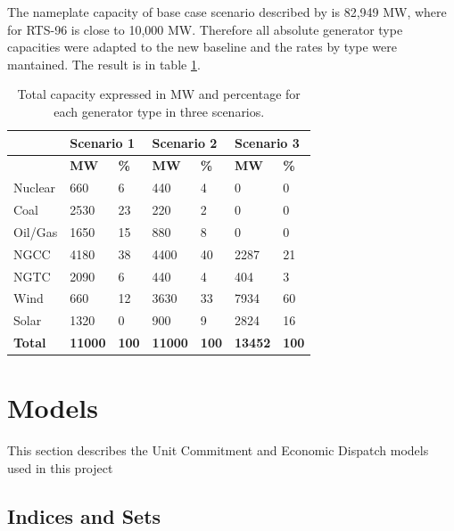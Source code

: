 \documentclass[12pt,LUDisStyle,twosided]{book}
\begin{document}
The nameplate capacity of base case scenario described by \citeauthor{shavel} is 82,949 MW, where for RTS-96 is close to 10,000 MW. Therefore all absolute generator type capacities were adapted to the new baseline and the rates by type were mantained. The result is in table \ref{table:ScenarioDataDescription}.

\begin{table}[h]
\centering
\begin{tabular}{|lllllll|}
\hline
 & \multicolumn{2}{l}{\textbf{Scenario 1}} & \multicolumn{2}{l}{\textbf{Scenario 2}} & \multicolumn{2}{l|}{\textbf{Scenario 3}} \\ \hline
 & \textbf{MW} & \textbf{\%} & \textbf{MW} & \textbf{\%} & \textbf{MW} & \textbf{\%} \\ \hline
Nuclear & 660 & 6 & 440 & 4 & 0 & 0 \\ \hline
Coal & 2530 & 23 & 220 & 2 & 0 & 0 \\ \hline
Oil/Gas & 1650 & 15 & 880 & 8 & 0 & 0 \\ \hline
NGCC & 4180 & 38 & 4400 & 40 & 2287 & 21 \\ \hline
NGTC & 2090 & 6 & 440 & 4 & 404 & 3 \\ \hline
Wind & 660 & 12 & 3630 & 33 & 7934 & 60 \\ \hline
Solar & 1320 & 0 & 900 & 9 & 2824 & 16 \\ \hline
\textbf{Total} & \textbf{11000} & \textbf{100} & \textbf{11000} & \textbf{100} & \textbf{13452} & \textbf{100} \\ \hline
\end{tabular}
\caption{Total capacity expressed in MW and percentage for each generator type in three scenarios.}
\label{table:ScenarioDataDescription}
\end{table}


\section{Models}

This section describes the Unit Commitment and Economic Dispatch models used in this project

\subsection{Indices and Sets}
\end{document}
